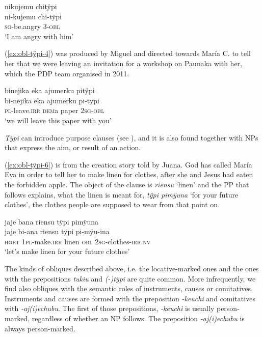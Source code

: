 \ea\label{ex:obl-tÿpi-3}
\begingl
\glpreamble nikujemu chitÿpi\\
\gla ni-kujemu chi-tÿpi\\
\textsc{sg}-be.angry 3-\textsc{obl}\\
\glft ‘I am angry with him’
\endgl
\trailingcitation{[jxx-e190210s-01]}
\xe

(\ref{ex:obl-tÿpi-4}) was produced by Miguel and directed towards María C. to tell her that we were leaving an invitation for a workshop on Paunaka with her, which the PDP team organised in 2011.

 \ea\label{ex:obl-tÿpi-4}
\begingl
\glpreamble binejika eka ajumerku pitÿpi\\
\gla bi-nejika eka ajumerku pi-tÿpi\\
\textsc{pl}-leave.\textsc{irr} \textsc{dem}a paper 2\textsc{sg}-\textsc{obl}\\
\glft ‘we will leave this paper with you’
\endgl
\trailingcitation{[mux-c110810l.011]}
\xe

\textit{Tÿpi} can introduce purpose clauses (see ), and it is also found together with NPs that express the aim,  or result of an action.

(\ref{ex:obl-tÿpi-6}) is from the creation story told by Juana. God has called María Eva in order to tell her to make linen for clothes, after she and Jesus had eaten the forbidden apple. The object of the clause is \textit{riensu} ‘linen’ and the PP that follows explains, what the linen is meant for, \textit{tÿpi pimÿuna} ‘for your future clothes’, the clothes people are supposed to wear from that point on.

\ea\label{ex:obl-tÿpi-6}
\begingl
\glpreamble jaje bana riensu tÿpi pimÿuna\\
\gla jaje bi-ana riensu tÿpi pi-mÿu-ina\\
\glb \textsc{hort} 1\textsc{pl}-make.\textsc{irr} linen \textsc{obl} 2\textsc{sg}-clothes-\textsc{irr.nv}\\
\glft ‘let’s make linen for your future clothes’
\endgl
\trailingcitation{[jxx-n101013s-1.501]}
\xe

The kinds of obliques described above, i.e. the locative-marked ones and the ones with the prepositions \textit{tukiu} and \textit{(-)tÿpi} are quite common. More infrequently, we find also obliques with the semantic roles of instruments, causes or comitatives. Instruments and causes are formed with the preposition \textit{-keuchi} and comitatives with \textit{-aj(i)echubu}. The first of those prepositions, \textit{-keuchi} is usually person-marked, regardless of whether an NP follows. The  preposition \textit{-aj(i)echubu} is always person-marked.

